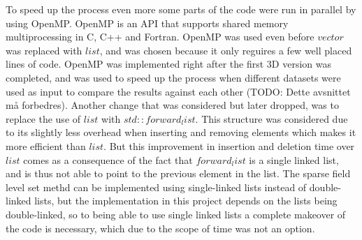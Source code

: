 To speed up the process even more some parts of the code were run in parallel by using OpenMP. OpenMP is an API that supports shared memory multiprocessing in C, C++ and Fortran. OpenMP was used even before $vector$ was replaced with $list$, and was chosen because it only reguires a few well placed lines of code. OpenMP was implemented right after the first 3D version was completed, and was used to speed up the process when different datasets were used as input to compare the results against each other (TODO: Dette avsnittet må forbedres).
Another change that was considered but later dropped, was to replace the use of $list$ with $std::forward_list$. This structure was considered due to its slightly less overhead when inserting and removing elements which makes it more efficient than $list$. But this improvement in insertion and deletion time over $list$ comes as a consequence of the fact that $forward_list$ is a single linked list, and is thus not able to point to the previous element in the list. The sparse field level set methd can be implemented using single-linked lists instead of double-linked lists, but the implementation in this project depends on the lists being double-linked, so to being able to use single linked lists a complete makeover of the code is necessary, which due to the scope of time was not an option.



